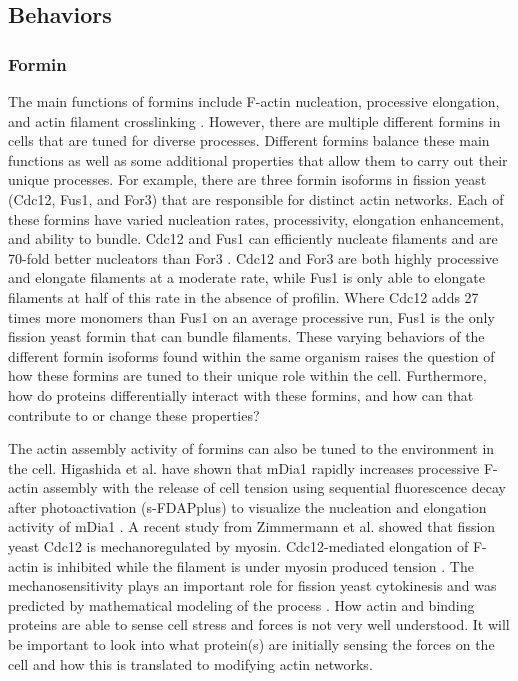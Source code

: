 \subsection{Behaviors}\label{ena-formin-behaviors}

\subsubsection{Formin}
The main functions of formins include F-actin nucleation, processive elongation, and actin filament crosslinking \citep{pollard_actin_2016}. However, there are multiple different formins in cells that are tuned for diverse processes. Different formins balance these main functions as well as some additional properties that allow them to carry out their unique processes. For example, there are three formin isoforms in fission yeast (Cdc12, Fus1, and For3) that are responsible for distinct actin networks. Each of these formins have varied nucleation rates, processivity, elongation enhancement, and ability to bundle. Cdc12 and Fus1 can efficiently nucleate filaments and are 70-fold better nucleators than For3 \citep{scott_functionally_2011}. Cdc12 and For3 are both highly processive and elongate filaments at a moderate rate, while Fus1 is only able to elongate filaments at half of this rate in the absence of profilin. Where Cdc12 adds 27 times more monomers than Fus1 on an average processive run, Fus1 is the only fission yeast formin that can bundle filaments. These varying behaviors of the different formin isoforms found within the same organism raises the question of how these formins are tuned to their unique role within the cell. Furthermore, how do proteins differentially interact with these formins, and how can that contribute to or change these properties?

The actin assembly activity of formins can also be tuned to the environment in the cell. Higashida et al. have shown that mDia1 rapidly increases processive F-actin assembly with the release of cell tension using sequential fluorescence decay after photoactivation (s-FDAPplus) to visualize the nucleation and elongation activity of mDia1 \citep{higashida_f-_2013}. A recent study from Zimmermann et al. showed that fission yeast Cdc12 is mechanoregulated by myosin. Cdc12-mediated elongation of F-actin is inhibited while the filament is under myosin produced tension \citep{zimmermann_mechanoregulated_2017}. The mechanosensitivity plays an important role for fission yeast cytokinesis and was predicted by mathematical modeling of the process \citep{vavylonis_model_2006}. How actin and binding proteins are able to sense cell stress and forces is not very well understood. It will be important to look into what protein(s) are initially sensing the forces on the cell and how this is translated to modifying actin networks. 


